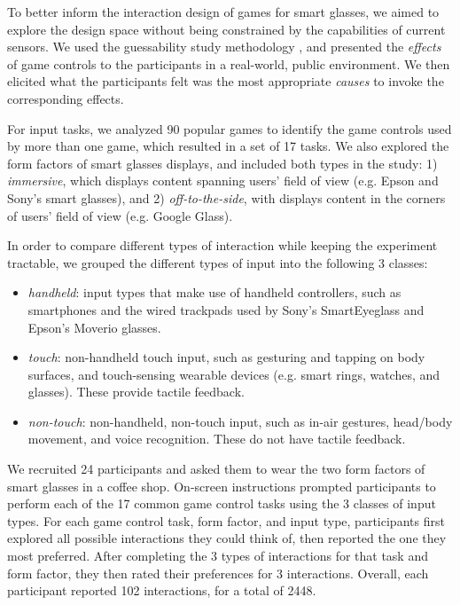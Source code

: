\documentclass{sigchi}
\begin{document}
To better inform the interaction design of games for smart glasses, we aimed to explore the design space without being constrained by the capabilities of current sensors. We used the guessability study methodology \cite{Wobbrock:2005:MGS:1056808.1057043}, and presented the \emph{effects} of game controls to the participants in a real-world, public environment. We then elicited what the participants felt was the most appropriate \emph{causes} to invoke the corresponding effects. 

For input tasks, we analyzed 90 popular games to identify the game controls used by more than one game, which resulted in a set of 17 tasks. We also explored the form factors of smart glasses displays, and included both types in the study: 1) \emph{immersive}, which displays content spanning users' field of view (e.g. Epson and Sony's smart glasses), and 2) \emph{off-to-the-side}, with displays content in the corners of users' field of view (e.g. Google Glass).

In order to compare different types of interaction while keeping the experiment tractable, we grouped the different types of input into the following 3 classes:
\begin{itemize}
  \item \emph{handheld}: input types that make use of handheld controllers, such as smartphones and the wired trackpads used by Sony's SmartEyeglass and Epson's Moverio glasses.
  \item \emph{touch}: non-handheld touch input, such as gesturing and tapping on body surfaces, and touch-sensing wearable devices (e.g. smart rings, watches, and glasses). These provide tactile feedback.
  \item \emph{non-touch}: non-handheld, non-touch input, such as in-air gestures, head/body movement, and voice recognition. These do not have tactile feedback.
\end{itemize}
 
We recruited 24 participants and asked them to wear the two form factors of smart glasses in a coffee shop. On-screen instructions prompted participants to perform each of the 17 common game control tasks using the 3 classes of input types. For each game control task, form factor, and input type, participants first explored all possible interactions they could think of, then reported the one they most preferred. After completing the 3 types of interactions for that task and form factor, they then rated their preferences for 3 interactions.  Overall, each participant reported 102 interactions, for a total of 2448. 
\end{document}
